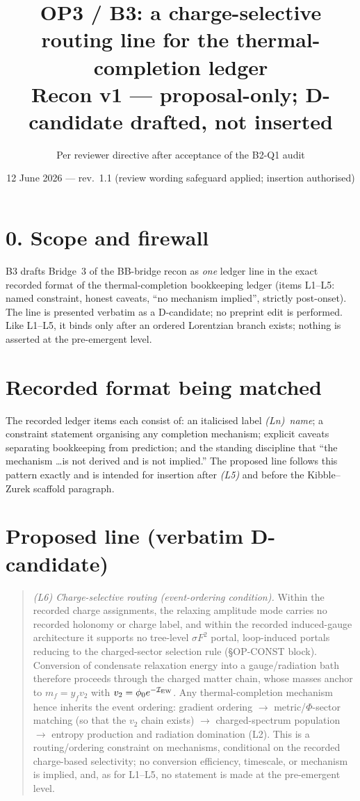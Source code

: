 \documentclass[11pt,a4paper]{article}
\title{\textbf{OP3 / B3: a charge-selective routing line for the
thermal-completion ledger}\\\large Recon v1 --- proposal-only; D-candidate
drafted, not inserted}
\author{Per reviewer directive after acceptance of the B2-Q1 audit}
\date{12 June 2026 --- rev.~1.1 (review wording safeguard applied;
insertion authorised)}
\begin{document}
\maketitle

\section*{0. Scope and firewall}
B3 drafts Bridge~3 of the BB-bridge recon as \emph{one} ledger line in the
exact recorded format of the thermal-completion bookkeeping ledger
(items L1--L5: named constraint, honest caveats, ``no mechanism implied'',
strictly post-onset). The line is presented verbatim as a D-candidate; no
preprint edit is performed. Like L1--L5, it binds only after an ordered
Lorentzian branch exists; nothing is asserted at the pre-emergent level.

\section{Recorded format being matched}
The recorded ledger items each consist of: an italicised label
\emph{(Ln)~name}; a constraint statement organising any completion
mechanism; explicit caveats separating bookkeeping from prediction; and the
standing discipline that ``the mechanism \dots is not derived and is not
implied.'' The proposed line follows this pattern exactly and is intended
for insertion after \emph{(L5)} and before the Kibble--Zurek scaffold
paragraph.

\section{Proposed line (verbatim D-candidate)}
\begin{quote}
\emph{(L6) Charge-selective routing (event-ordering condition).}
Within the recorded charge assignments, the relaxing amplitude mode carries
no recorded holonomy or charge label, and within the recorded induced-gauge
architecture it supports no tree-level $\sigma F^2$ portal, loop-induced
portals reducing to the charged-sector selection rule
(\S OP-CONST block). Conversion of condensate relaxation energy into a
gauge/radiation bath therefore proceeds through the charged matter chain,
whose masses anchor to $m_f=y_fv_2$ with
$v_2=\phi_0e^{-\mathcal I_{\rm EW}}$. Any thermal-completion mechanism
hence inherits the event ordering: gradient ordering $\to$
metric/$\Phi$-sector matching (so that the $v_2$ chain exists) $\to$
charged-spectrum population $\to$ entropy production and radiation
domination (L2). This is a routing/ordering constraint on mechanisms,
conditional on the recorded charge-based selectivity; no conversion
efficiency, timescale, or mechanism is implied, and, as for L1--L5, no
statement is made at the pre-emergent level.
\end{quote}
\end{document}
